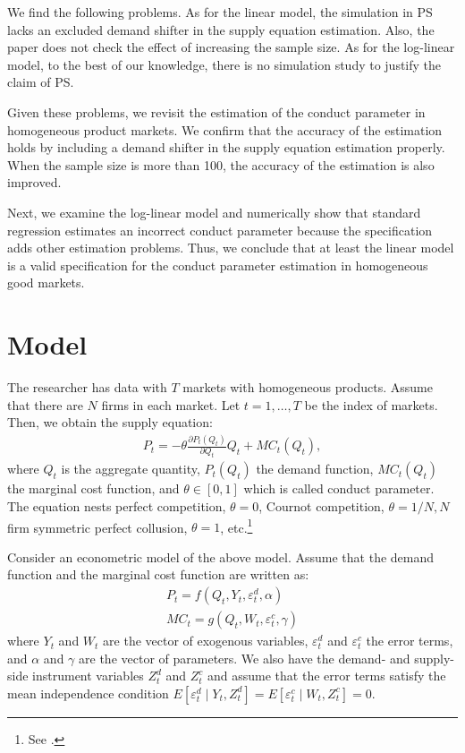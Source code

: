\documentclass[11pt, a4paper]{article}
\begin{document}
We find the following problems.
As for the linear model, the simulation in PS lacks an excluded demand shifter in the supply equation estimation. 
Also, the paper does not check the effect of increasing the sample size. 
As for the log-linear model, to the best of our knowledge, there is no simulation study to justify the claim of PS.

Given these problems, we revisit the estimation of the conduct parameter in homogeneous product markets.
We confirm that the accuracy of the estimation holds by including a demand shifter in the supply equation estimation properly. 
When the sample size is more than 100, the accuracy of the estimation is also improved.

Next, we examine the log-linear model and numerically show that standard regression estimates an incorrect conduct parameter because the specification adds other estimation problems.
Thus, we conclude that at least the linear model is a valid specification for the conduct parameter estimation in homogeneous good markets.



\section{Model}
The researcher has data with $T$ markets with homogeneous products.
Assume that there are $N$ firms in each market.
Let $t = 1,\ldots, T$ be the index of markets.
Then, we obtain the supply equation:
\begin{align}
     P_t = -\theta\frac{\partial P_t(Q_t)}{\partial Q_t}Q_t + MC_t(Q_t),\label{eq:supply_equation}
\end{align}
where $Q_t$ is the aggregate quantity, $P_t(Q_{t})$ the demand function, $MC_{t}(Q_{t})$ the marginal cost function, and $\theta\in[0,1]$ which is called conduct parameter. 
The equation nests perfect competition, $\theta=0$, Cournot competition, $\theta=1/N, N$ firm symmetric perfect collusion, $\theta=1$, etc.\footnote{See \cite{bresnahan1982oligopoly}.} 

Consider an econometric model of the above model.
Assume that the demand function and the marginal cost function are written as: 
\begin{align}
    P_t = f(Q_t, Y_t, \varepsilon^{d}_{t}, \alpha) \label{eq:demand}\\
    MC_t = g(Q_t, W_{t}, \varepsilon^{c}_{t}, \gamma)\label{eq:marginal_cost}
\end{align}
where $Y_t$ and $W_{t}$ are the vector of exogenous variables, $\varepsilon^{d}_{t}$ and $\varepsilon^{c}_{t}$ the error terms, and $\alpha$ and $\gamma$ are the vector of parameters.
We also have the demand- and supply-side instrument variables $Z^{d}_{t}$ and $Z^{c}_{t}$ and assume that the error terms satisfy the mean independence condition $E[\varepsilon^{d}_{t}\mid Y_t, Z^{d}_{t}] = E[\varepsilon^{c}_{t} \mid W_{t}, Z^{c}_{t}] =0$.
\end{document}
